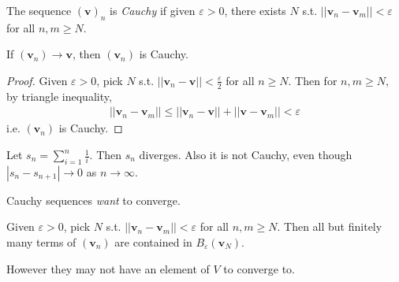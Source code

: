 \documentclass[a4paper]{article}
\begin{document}
\begin{defi}
The sequence $\left(\mathbf{v}\right)_n$ is \emph{Cauchy} if given $\varepsilon > 0$, there exists $N$ s.t. $||\mathbf{v}_n - \mathbf{v}_m|| < \varepsilon$ for all $n,m \geq N$.
\end{defi}

\begin{eg}
If $\left(\mathbf{v}_n\right) \to \mathbf{v}$, then $\left(\mathbf{v}_n\right)$ is Cauchy.
\begin{proof}
Given $\varepsilon>0$, pick $N$ s.t. $||\mathbf{v}_n-\mathbf{v}|| < \frac{\varepsilon}{2}$ for all $n \geq N$. Then for $n,m \geq N$, by triangle inequality,
\begin{equation*}
\begin{aligned}
||\mathbf{v}_n - \mathbf{v}_m|| \leq ||\mathbf{v}_n - \mathbf{v}||+||\mathbf{v}-\mathbf{v}_m|| < \varepsilon
\end{aligned}
\end{equation*}
i.e. $\left(\mathbf{v}_n\right)$ is Cauchy.
\end{proof}
\end{eg}

\begin{eg}
Let $s_n = \sum_{i=1}^n \frac{1}{i}$. Then $s_n$ diverges. Also it is not Cauchy, even though $|s_n - s_{n+1}| \to 0$ as $n \to \infty$.
\end{eg}

Cauchy sequences \emph{want} to converge.

\begin{eg}
Given $\varepsilon>0$, pick $N$ s.t. $||\mathbf{v}_n - \mathbf{v}_m|| < \varepsilon$ for all $n,m \geq N$. Then all but finitely many terms of $\left(\mathbf{v}_n\right)$ are contained in $B_\varepsilon\left(\mathbf{v}_N\right)$.
\end{eg}

However they may not have an element of $V$ to converge to.
\end{document}
